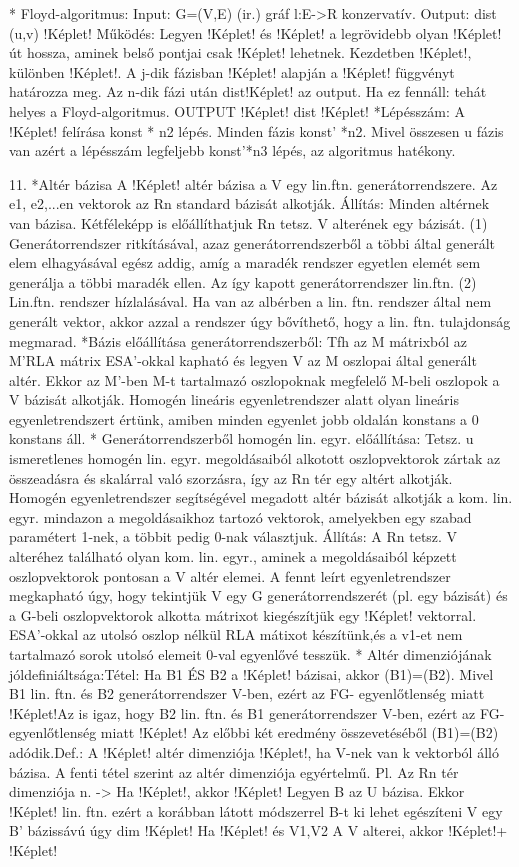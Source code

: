 \documentclass[10pt]{article}
\begin{document}
* Floyd-algoritmus: Input: G=(V,E) (ir.) gráf l:E->R konzervatív. Output: dist (u,v) !Képlet! Működés: Legyen !Képlet! és !Képlet! a legrövidebb olyan !Képlet! út hossza, aminek belső pontjai csak !Képlet! lehetnek. Kezdetben !Képlet!, különben !Képlet!. A j-dik fázisban !Képlet! alapján a !Képlet! függvényt határozza meg. Az n-dik fázi után dist!Képlet! az output. Ha ez fennáll: tehát helyes a Floyd-algoritmus. OUTPUT !Képlet! dist !Képlet!
*Lépésszám: A !Képlet! felírása konst * n2 lépés. Minden fázis konst' *n2. Mivel összesen u fázis van azért a lépésszám legfeljebb konst'*n3 lépés, az algoritmus hatékony.

11.
*Altér bázisa A !Képlet! altér bázisa a V egy lin.ftn. generátorrendszere. Az e1, e2,...en vektorok az Rn standard bázisát alkotják. Állítás: Minden altérnek van bázisa. Kétféleképp is előállíthatjuk Rn tetsz. V alterének egy bázisát.  (1) Generátorrendszer ritkításával, azaz generátorrendszerből a többi által generált elem elhagyásával egész addig, amíg a maradék rendszer egyetlen elemét sem generálja a többi maradék ellen. Az így kapott generátorrendszer lin.ftn. (2) Lin.ftn. rendszer hízlalásával. Ha van az albérben a lin. ftn. rendszer által nem generált vektor, akkor azzal a rendszer úgy bővíthető, hogy a lin. ftn. tulajdonság megmarad.
*Bázis előállítása generátorrendszerből: Tfh az M mátrixból az M'RLA mátrix ESA'-okkal kapható és legyen V az M oszlopai által generált altér. Ekkor az M'-ben M-t tartalmazó oszlopoknak megfelelő M-beli oszlopok a V bázisát alkotják. Homogén lineáris egyenletrendszer alatt olyan lineáris egyenletrendszert értünk, amiben minden egyenlet jobb oldalán konstans a 0 konstans áll.
* Generátorrendszerből homogén lin. egyr. előállítása: Tetsz. u ismeretlenes homogén lin. egyr. megoldásaiból alkotott oszlopvektorok zártak az összeadásra és skalárral való szorzásra, így az Rn tér egy altért alkotják. Homogén egyenletrendszer segítségével megadott altér bázisát alkotják a kom. lin. egyr. mindazon a megoldásaikhoz tartozó vektorok, amelyekben egy szabad paramétert 1-nek, a többit pedig 0-nak választjuk. Állítás: A Rn tetsz. V alteréhez található olyan kom. lin. egyr., aminek a megoldásaiból képzett oszlopvektorok pontosan a V altér elemei. A fennt leírt egyenletrendszer megkapható úgy, hogy tekintjük V egy G generátorrendszerét (pl. egy bázisát) és a G-beli oszlopvektorok alkotta mátrixot kiegészítjük egy !Képlet! vektorral. ESA'-okkal az utolsó oszlop nélkül RLA mátixot készítünk,és a v1-et nem tartalmazó sorok utolsó elemeit 0-val egyenlővé tesszük.
* Altér dimenziójának jóldefiniáltsága:Tétel: Ha B1 ÉS B2 a !Képlet! bázisai, akkor (B1)=(B2). Mivel B1 lin. ftn. és B2 generátorrendszer V-ben, ezért az FG- egyenlőtlenség miatt !Képlet!Az is igaz, hogy B2 lin. ftn. és B1 generátorrendszer V-ben, ezért az FG- egyenlőtlenség miatt !Képlet! Az előbbi két eredmény összevetéséből (B1)=(B2) adódik.Def.: A !Képlet!
altér dimenziója !Képlet!, ha V-nek van k vektorból álló bázisa. A fenti tétel szerint az altér dimenziója egyértelmű. Pl. Az Rn tér dimenziója n. -> Ha !Képlet!, akkor !Képlet! Legyen B az U bázisa. Ekkor !Képlet! lin. ftn. ezért a korábban látott módszerrel B-t ki lehet egészíteni V egy B' bázissávú úgy dim !Képlet! Ha !Képlet! és V1,V2 A V alterei, akkor !Képlet!+ !Képlet!
\end{document}
